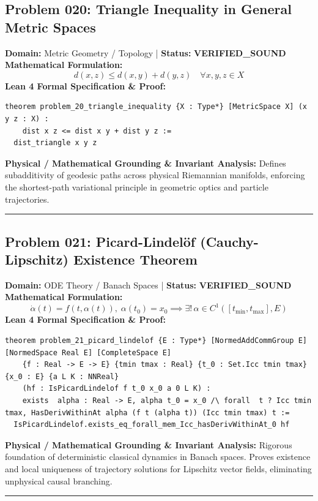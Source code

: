 \documentclass[10pt,a4paper]{article}
\begin{document}
\subsection*{Problem 020: Triangle Inequality in General Metric Spaces}
\textbf{Domain:} Metric Geometry / Topology \quad | \quad \textbf{Status:} \textcolor{green!70!black}{\textbf{VERIFIED\_SOUND}}\\
\textbf{Mathematical Formulation:}
\begin{equation*}
  d(x, z) \le d(x, y) + d(y, z) \quad \forall x, y, z \in X
\end{equation*}
\textbf{Lean 4 Formal Specification \& Proof:}
\begin{lstlisting}
theorem problem_20_triangle_inequality {X : Type*} [MetricSpace X] (x y z : X) : 
    dist x z <= dist x y + dist y z :=
  dist_triangle x y z
\end{lstlisting}
\textbf{Physical / Mathematical Grounding \& Invariant Analysis:}
Defines subadditivity of geodesic paths across physical Riemannian manifolds, enforcing the shortest-path variational principle in geometric optics and particle trajectories.
\vspace{0.8em}\hrule\vspace{0.8em}
\subsection*{Problem 021: Picard-Lindelöf (Cauchy-Lipschitz) Existence Theorem}
\textbf{Domain:} ODE Theory / Banach Spaces \quad | \quad \textbf{Status:} \textcolor{green!70!black}{\textbf{VERIFIED\_SOUND}}\\
\textbf{Mathematical Formulation:}
\begin{equation*}
  \dot{\alpha}(t) = f(t, \alpha(t)), \; \alpha(t_0) = x_0 \implies \exists!\, \alpha \in C^1([t_{\min}, t_{\max}], E)
\end{equation*}
\textbf{Lean 4 Formal Specification \& Proof:}
\begin{lstlisting}
theorem problem_21_picard_lindelof {E : Type*} [NormedAddCommGroup E] [NormedSpace Real E] [CompleteSpace E]
    {f : Real -> E -> E} {tmin tmax : Real} {t_0 : Set.Icc tmin tmax} {x_0 : E} {a L K : NNReal}
    (hf : IsPicardLindelof f t_0 x_0 a 0 L K) :
    exists  alpha : Real -> E, alpha t_0 = x_0 /\ forall  t ? Icc tmin tmax, HasDerivWithinAt alpha (f t (alpha t)) (Icc tmin tmax) t :=
  IsPicardLindelof.exists_eq_forall_mem_Icc_hasDerivWithinAt_0 hf
\end{lstlisting}
\textbf{Physical / Mathematical Grounding \& Invariant Analysis:}
Rigorous foundation of deterministic classical dynamics in Banach spaces. Proves existence and local uniqueness of trajectory solutions for Lipschitz vector fields, eliminating unphysical causal branching.
\vspace{0.8em}\hrule\vspace{0.8em}
\end{document}
